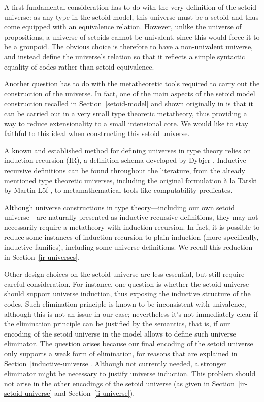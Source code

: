 \documentclass{easychair}
\begin{document}
A first fundamental consideration has to do with the very definition of the setoid
universe: as any type in the setoid model, this universe must be a setoid and
thus come equipped with an equivalence relation. However, unlike the universe of
propositions, a universe of setoids cannot be univalent, since this would force
it to be a groupoid. The obvious choice is therefore to have a non-univalent
universe, and instead define the universe's relation so that it reflects a
simple syntactic equality of codes rather than setoid equivalence.

Another question has to do with the metatheoretic tools required to carry out
the construction of the universe. In fact, one of the main aspects of the setoid
model construction recalled in Section~\ref{setoid-model} and shown originally
in \cite{setoid99} is that it can be carried out in a very small type theoretic
metatheory, thus providing a way to reduce extensionality to a small intensional
core.
%
We would like to stay faithful to this ideal when constructing this setoid
universe.

A known and established method for defining universes in type theory relies on
induction-recursion (IR), a definition schema developed by Dybjer
\cite{ir-dybjer, dybjer-setzer}. Inductive-recursive definitions can be found
throughout the literature, from the already mentioned type theoretic universes,
including the original formulation \`{a} la Tarski by Martin-L\"of
\cite{libretto}, to metamathematical tools like computability predicates.

Although universe constructions in type theory---including our own setoid
universe---are naturally presented as inductive-recursive definitions, they may
not necessarily require a metatheory with induction-recursion. In fact, it is
possible to reduce some instances of induction-recursion to plain induction
(more specifically, inductive families), including some universe definitions. We
recall this reduction in Section~\ref{ir-universes}.

Other design choices on the setoid universe are less essential, but still
require careful consideration. For instance, one question is whether the setoid
universe should support universe induction, thus exposing the inductive
structure of the codes. Such elimination principle is known to be inconsistent
with univalence, although this is not an issue in our case; nevertheless it's
not immediately clear if the elimination principle can be justified by the
semantics, that is, if our encoding of the setoid universe in the model allows
to define such universe eliminator.
%
The question arises because our final encoding of the setoid universe only
supports a weak form of elimination, for reasons that are explained in
Section~\ref{inductive-universe}. Although not currently needed, a stronger
eliminator might be necessary to justify universe induction. This problem should
not arise in the other encodings of the setoid universe (as given in
Section~\ref{ir-setoid-universe} and Section~\ref{ii-universe}).
\end{document}
